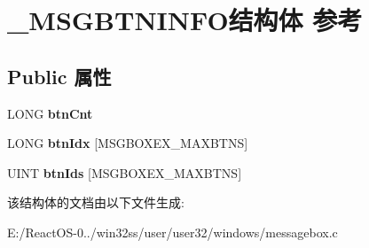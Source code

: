 \hypertarget{struct___m_s_g_b_t_n_i_n_f_o}{}\section{\+\_\+\+M\+S\+G\+B\+T\+N\+I\+N\+F\+O结构体 参考}
\label{struct___m_s_g_b_t_n_i_n_f_o}
\subsection*{Public 属性}
\begin{DoxyCompactItemize}
\item 
\mbox{\label{struct___m_s_g_b_t_n_i_n_f_o_a6571a6c593c8a7b4de69a22e69cc69fb}} 
L\+O\+NG {\bfseries btn\+Cnt}
\item 
\mbox{\label{struct___m_s_g_b_t_n_i_n_f_o_a00e073039483d38c73e521eba08a0c4c}} 
L\+O\+NG {\bfseries btn\+Idx} \mbox{[}M\+S\+G\+B\+O\+X\+E\+X\+\_\+\+M\+A\+X\+B\+T\+NS\mbox{]}
\item 
\mbox{\label{struct___m_s_g_b_t_n_i_n_f_o_afaf29652298e6c7c0a42b54dfa751c20}} 
U\+I\+NT {\bfseries btn\+Ids} \mbox{[}M\+S\+G\+B\+O\+X\+E\+X\+\_\+\+M\+A\+X\+B\+T\+NS\mbox{]}
\end{DoxyCompactItemize}


该结构体的文档由以下文件生成\+:\begin{DoxyCompactItemize}
\item 
E\+:/\+React\+O\+S-\/0../win32ss/user/user32/windows/messagebox.\+c\end{DoxyCompactItemize}
